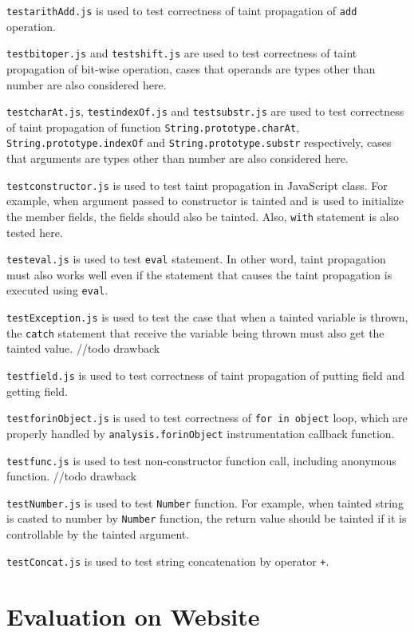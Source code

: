\texttt{testarithAdd.js} is used to test correctness of taint propagation of \texttt{add} operation.

\texttt{testbitoper.js} and \texttt{testshift.js} are used to test correctness of taint propagation of bit-wise operation, cases that operands are types other than number are also considered here.

\texttt{testcharAt.js}, \texttt{testindexOf.js} and \texttt{testsubstr.js} are used to test correctness of taint propagation of function \texttt{String.prototype.charAt}, \texttt{String.prototype.indexOf} and \texttt{String.prototype.substr} respectively, cases that arguments are types other than number are also considered here.

\texttt{testconstructor.js} is used to test taint propagation in JavaScript class. For example, when argument passed to constructor is tainted and is used to initialize the member fields, the fields should also be tainted. Also, \texttt{with} statement is also tested here.

\texttt{testeval.js} is used to test \texttt{eval} statement. In other word, taint propagation must also works well even if the statement that causes the taint propagation is executed using \texttt{eval}.

\texttt{testException.js} is used to test the case that when a tainted variable is thrown, the \texttt{catch} statement that receive the variable being thrown must also get the tainted value. //todo drawback

\texttt{testfield.js} is used to test correctness of taint propagation of putting field and getting field.

\texttt{testforinObject.js} is used to test correctness of \texttt{for in object} loop, which are properly handled by \texttt{analysis.forinObject} instrumentation callback function.

\texttt{testfunc.js} is used to test non-constructor function call, including anonymous function. //todo drawback

\texttt{testNumber.js} is used to test \texttt{Number} function. For example, when tainted string is casted to number by \texttt{Number} function, the return value should be tainted if it is controllable by the tainted argument.

\texttt{testConcat.js} is used to test string concatenation by operator \texttt{+}.

\section{Evaluation on Website}

